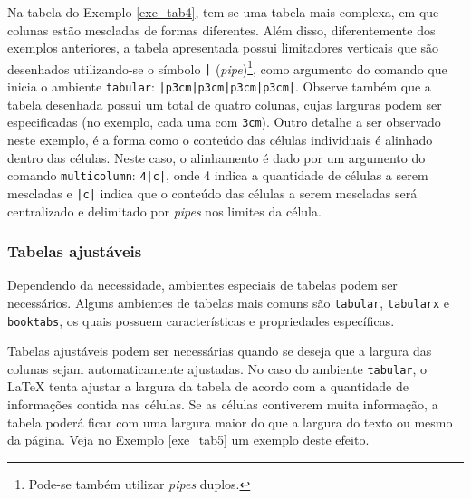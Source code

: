 Na tabela do Exemplo \ref{exe_tab4}, tem-se uma tabela mais complexa, em que colunas estão mescladas de formas diferentes. Além disso, diferentemente dos exemplos anteriores, a tabela apresentada possui limitadores verticais que são desenhados utilizando-se o símbolo {\tt |} (\textit{pipe})\footnote{Pode-se também utilizar \textit{pipes} duplos.}, como argumento do comando que inicia o ambiente \texttt{tabular}: {\tt |p{3cm}|p{3cm}|p{3cm}|p{3cm}|}. Observe também que a tabela desenhada possui um total de quatro colunas, cujas larguras podem ser especificadas (no exemplo, cada uma com {\tt 3cm}). Outro detalhe a ser observado neste exemplo, é a forma como o conteúdo das células individuais é alinhado dentro das células. Neste caso, o alinhamento é dado por um argumento do comando \texttt{multicolumn}: \texttt{{4}{|c|}}, onde 4 indica a quantidade de células a serem mescladas e \texttt{|c|} indica que o conteúdo das células a serem mescladas será centralizado e delimitado por \textit{pipes} nos limites da célula.

\subsubsection*{Tabelas ajustáveis}
\label{sec:amb_tabs}

Dependendo da necessidade, ambientes especiais de tabelas podem ser necessários. Alguns ambientes de tabelas mais comuns são {\tt tabular}, {\tt tabularx} e {\tt booktabs}, os quais possuem características e propriedades específicas.


Tabelas ajustáveis podem ser necessárias quando se deseja que a largura das colunas sejam automaticamente ajustadas. No caso do ambiente {\tt tabular}, o \LaTeX{} tenta ajustar a largura da tabela de acordo com a quantidade de informações contida nas células. Se as células contiverem muita informação, a tabela poderá ficar com uma largura maior do que a largura do texto ou mesmo da página. Veja no Exemplo \ref{exe_tab5} um exemplo deste efeito.


